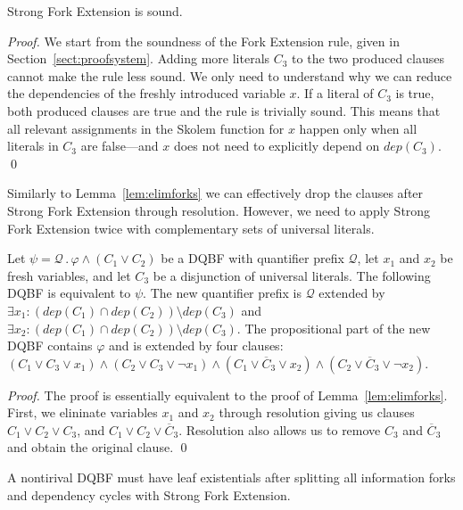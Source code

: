 \documentclass{svjour3}
\newcommand{\ldot}{\mathpunct{.}}
\newcommand{\dep}{\mathit{dep}}
\begin{document}
\begin{lemma}
\label{lem:SFESoundness}
    Strong Fork Extension is sound.
\end{lemma}
\begin{proof}
We start from the soundness of the Fork Extension rule, given in Section~\ref{sect:proofsystem}. 
Adding more literals $C_3$ to the two produced clauses cannot make the rule less sound. 
We only need to understand why we can reduce the dependencies of the freshly introduced variable $x$. 
If a literal of $C_3$ is true, both produced clauses are true and the rule is trivially sound. 
This means that all relevant assignments in the Skolem function for $x$ happen only when all literals in $C_3$ are false---and $x$ does not need to explicitly depend on $\dep(C_3)$.
\qed
\end{proof}


Similarly to Lemma~\ref{lem:elimforks} we can effectively drop the clauses after Strong Fork Extension through resolution.
However, we need to apply Strong Fork Extension twice with complementary sets of universal literals.

\begin{lemma}
\label{lem:elimstrongforks}
Let $\psi=\mathcal Q\ldot\varphi\wedge (C_1 \lor C_2)$ be a DQBF with quantifier prefix $\mathcal Q$, let $x_1$ and $x_2$ be fresh variables, and let $C_3$ be a disjunction of universal literals.
The following DQBF is equivalent to $\psi$.
The new quantifier prefix is $\mathcal Q$ extended by $\exists x_1 : (\dep(C_1)\cap\dep(C_2))\setminus\dep(C_3)$ and $\exists x_2 : (\dep(C_1)\cap\dep(C_2))\setminus\dep(C_3)$. 
The propositional part of the new DQBF contains $\varphi$ and is extended by four clauses: $(C_1\lor C_3\lor x_1) \wedge (C_2\lor C_3\lor \neg x_1) \wedge (C_1\lor \overline C_3\lor x_2) \wedge (C_2\lor \overline C_3\lor \neg x_2)$.
\end{lemma}

\begin{proof}
	The proof is essentially equivalent to the proof of Lemma~\ref{lem:elimforks}.
	First, we elininate variables $x_1$ and $x_2$ through resolution giving us clauses $C_1 \lor C_2 \lor C_3$, and $C_1 \lor C_2 \lor \overline C_3$.
	Resolution also allows us to remove $C_3$ and $\overline C_3$ and obtain the original clause.
\qed
\end{proof}


\begin{lemma}
\label{lem:strongleafexists}
A nontirival DQBF must have leaf existentials after splitting all information forks and dependency cycles with Strong Fork Extension.
\end{lemma}
\end{document}
